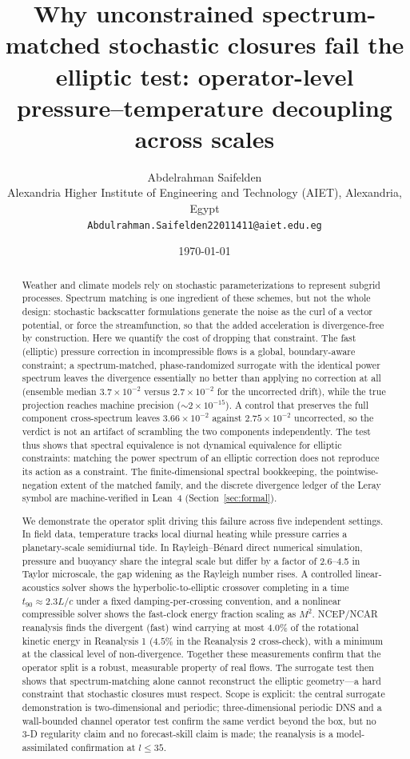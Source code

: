 \documentclass[11pt]{article}
\title{Why unconstrained spectrum-matched stochastic closures fail the elliptic test: operator-level pressure--temperature decoupling across scales}
\author{Abdelrahman Saifelden\\ Alexandria Higher Institute of Engineering and Technology (AIET), Alexandria, Egypt\\ \texttt{Abdulrahman.Saifelden22011411@aiet.edu.eg}}
\date{\today}
\begin{document}
\maketitle

\begin{abstract}
Weather and climate models rely on stochastic parameterizations to represent subgrid processes. Spectrum matching is one ingredient of these schemes, but not the whole design: stochastic backscatter formulations generate the noise as the curl of a vector potential, or force the streamfunction, so that the added acceleration is divergence-free by construction. Here we quantify the cost of dropping that constraint. The fast (elliptic) pressure correction in incompressible flows is a global, boundary-aware constraint; a spectrum-matched, phase-randomized surrogate with the identical power spectrum leaves the divergence essentially no better than applying no correction at all (ensemble median $3.7\times10^{-2}$ versus $2.7\times10^{-2}$ for the uncorrected drift), while the true projection reaches machine precision ($\sim2\times10^{-15}$). A control that preserves the full component cross-spectrum leaves $3.66\times10^{-2}$ against $2.75\times10^{-2}$ uncorrected, so the verdict is not an artifact of scrambling the two components independently. The test thus shows that spectral equivalence is not dynamical equivalence for elliptic constraints: matching the power spectrum of an elliptic correction does not reproduce its action as a constraint. The finite-dimensional spectral bookkeeping, the pointwise-negation extent of the matched family, and the discrete divergence ledger of the Leray symbol are machine-verified in Lean~4 (Section~\ref{sec:formal}).

We demonstrate the operator split driving this failure across five independent settings. In field data, temperature tracks local diurnal heating while pressure carries a planetary-scale semidiurnal tide. In Rayleigh--B\'enard direct numerical simulation, pressure and buoyancy share the integral scale but differ by a factor of 2.6--4.5 in Taylor microscale, the gap widening as the Rayleigh number rises. A controlled linear-acoustics solver shows the hyperbolic-to-elliptic crossover completing in a time $t_{90}\approx2.3L/c$ under a fixed damping-per-crossing convention, and a nonlinear compressible solver shows the fast-clock energy fraction scaling as $M^{2}$. NCEP/NCAR reanalysis finds the divergent (fast) wind carrying at most $4.0\%$ of the rotational kinetic energy in Reanalysis 1 ($4.5\%$ in the Reanalysis 2 cross-check), with a minimum at the classical level of non-divergence. Together these measurements confirm that the operator split is a robust, measurable property of real flows. The surrogate test then shows that spectrum-matching alone cannot reconstruct the elliptic geometry---a hard constraint that stochastic closures must respect. Scope is explicit: the central surrogate demonstration is two-dimensional and periodic; three-dimensional periodic DNS and a wall-bounded channel operator test confirm the same verdict beyond the box, but no 3-D regularity claim and no forecast-skill claim is made; the reanalysis is a model-assimilated confirmation at $l \leq 35$.
\end{abstract}
\end{document}

